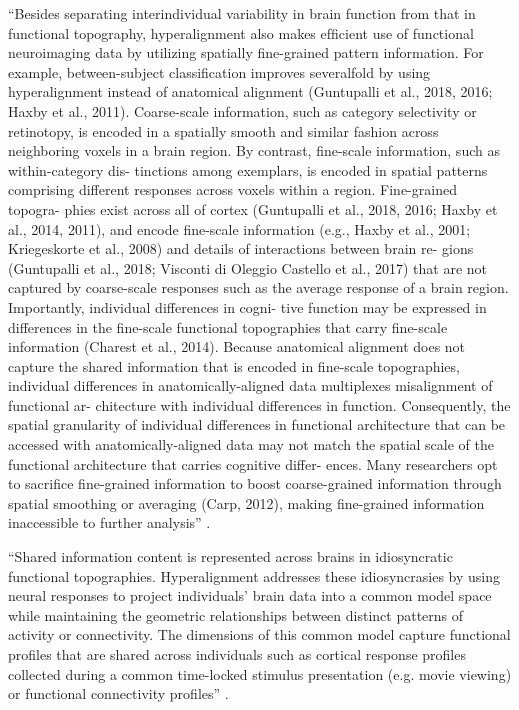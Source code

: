 ``Besides separating interindividual variability in brain function from that in
functional topography, hyperalignment also makes efﬁcient use of functional
neuroimaging data by utilizing spatially ﬁne-grained pattern information. For
example, between-subject classiﬁcation improves severalfold by using
hyperalignment instead of anatomical alignment (Guntupalli et al., 2018, 2016;
Haxby et al., 2011). Coarse-scale information, such as category selectivity or
retinotopy, is encoded in a spatially smooth and similar fashion across
neighboring voxels in a brain region. By contrast, ﬁne-scale information, such
as within-category dis- tinctions among exemplars, is encoded in spatial
patterns comprising different responses across voxels within a region.
Fine-grained topogra- phies exist across all of cortex (Guntupalli et al., 2018,
2016; Haxby et al., 2014, 2011), and encode ﬁne-scale information (e.g., Haxby
et al., 2001; Kriegeskorte et al., 2008) and details of interactions between
brain re- gions (Guntupalli et al., 2018; Visconti di Oleggio Castello et al.,
2017) that are not captured by coarse-scale responses such as the average
response of a brain region. Importantly, individual differences in cogni- tive
function may be expressed in differences in the ﬁne-scale functional
topographies that carry ﬁne-scale information (Charest et al., 2014). Because
anatomical alignment does not capture the shared information that is encoded in
ﬁne-scale topographies, individual differences in anatomically-aligned data
multiplexes misalignment of functional ar- chitecture with individual
differences in function. Consequently, the spatial granularity of individual
differences in functional architecture that can be accessed with
anatomically-aligned data may not match the spatial scale of the functional
architecture that carries cognitive differ- ences. Many researchers opt to
sacriﬁce ﬁne-grained information to boost coarse-grained information through
spatial smoothing or averaging (Carp, 2012), making ﬁne-grained information
inaccessible to further analysis'' \citep{feilong2018reliable}.


``Shared information content is represented across brains in idiosyncratic
functional topographies. Hyperalignment addresses these idiosyncrasies by using
neural responses to project individuals’ brain data into a common model space
while maintaining the geometric relationships between distinct patterns of
activity or connectivity. The dimensions of this common model capture functional
proﬁles that are shared across individuals such as cortical response proﬁles
collected during a common time-locked stimulus presentation (e.g. movie viewing)
or functional connectivity proﬁles'' \citep{busch2021hybrid}.

